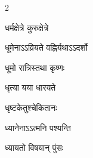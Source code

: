 \begin{multicols}{2}
\begin{indexlist}
\item धर्मक्षेत्रे कुरुक्षेत्रे \dotfill {}
\item धूमेनाऽऽव्रियते वह्निर्यथाऽऽदर्शो \dotfill {}
\item धूमो रात्रिस्तथा कृष्णः \dotfill {}
\item धृत्या यया धारयते \dotfill {}
\item धृष्टकेतुश्चेकितानः \dotfill {}
\item ध्यानेनाऽऽत्मनि पश्यन्ति \dotfill {}
\item ध्यायतो विषयान् पुंसः \dotfill {}
\end{indexlist}


\end{multicols}
